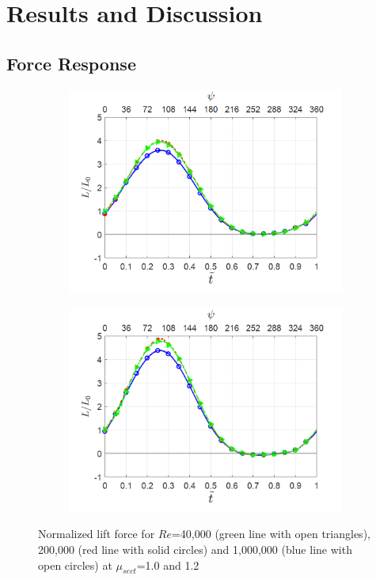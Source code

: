 \section{Results and Discussion}

\subsection{Force Response}

\begin{figure}[H]
	\begin{subfigure}{0.5\textwidth}
		\includegraphics[width=1\textwidth]{figures/lift_Re_effect_lambda_1pt0.png}
		\label{fig:lift_Re_comparision_lambda_1p0}
	\end{subfigure}
 	\begin{subfigure}{0.5\textwidth}
		\includegraphics[width=1\textwidth]{figures/lift_Re_effect_lambda_1pt2.png}
		\label{fig:lift_Re_comparision_lambda_1p2}
	\end{subfigure}

 	\caption{Normalized lift force for $Re$=40,000 (green line with open triangles), 200,000 (red line with solid circles) and 1,000,000 (blue line with open circles) at $\mu_{sect}$=1.0 and 1.2}
 	\label{fig:lift_comparison}
\end{figure}

